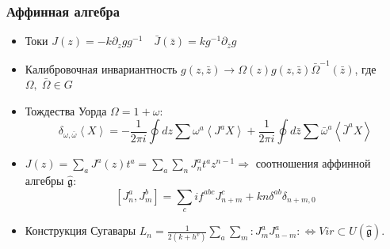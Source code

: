 \documentclass[pdftex]{beamer}
\newcommand{\gfh}{\hat{\mathfrak{g}}}
\theoremstyle{definition} \newtheorem{Def}{Определение}
\begin{document}
\begin{frame}
  \frametitle{Аффинная алгебра}

  \begin{itemize}
  \item   Токи 
    $J(z)= -k \partial_zg g^{-1}\quad \bar J(\bar z)=k g^{-1}\partial_{\bar z}g$

  \item Калибровочная инвариантность $   g(z,\bar z)\to \Omega(z)g(z,\bar z)\bar \Omega^{-1}(\bar z)$,
    где $\Omega,\;\bar \Omega \in G$

  \item Тождества Уорда $\Omega=1+\omega$:
    \begin{equation*}
      \label{eq:87}
      \delta_{\omega,\bar \omega}\left< X \right>=-\frac{1}{2\pi i}\oint dz \sum\omega^a \left< J^a X\right>+
      \frac{1}{2\pi i} \oint d\bar z \sum \bar \omega^a \left< \bar J^a X\right>
    \end{equation*}
  \item  $J(z)=\sum_{a} J^{a}(z) t^{a}=\sum_{a} \sum _{n} J^{a}_{n} t^{a} z^{n-1} \Rightarrow$ соотношения аффинной алгебры $\gfh$: 
    \begin{equation*}
      \left[J^a_n,J^b_m\right]=\sum_c i f^{abc}J^c_{n+m}+kn\delta^{ab}\delta_{n+m,0}
    \end{equation*}
  \item Конструкция Сугавары $  L_n=\frac{1}{2(k+h^v)}\sum\limits_a\sum\limits_m:J^a_m J^a_{n-m}: \Leftrightarrow Vir\subset U(\gfh)$.
  \end{itemize}
\end{frame}
\end{document}
